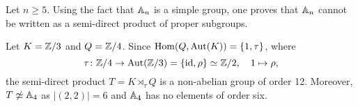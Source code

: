 Let $n\geq5$. 
Using the fact that $\mathbb{A}_n$ is a simple group,  
one proves that $\mathbb{A}_n$ cannot be written as a semi-direct product of proper subgroups. 

\begin{example}
Let $K=\mathbb{Z}/3$ and $Q=\mathbb{Z}/4$. Since $\operatorname{Hom}(Q,\operatorname{Aut}(K))=\{1,\tau\}$, where 
\[
\tau\colon\mathbb{Z}/4\to\operatorname{Aut}(\mathbb{Z}/3)=\{\operatorname{id},\rho\}\simeq\mathbb{Z}/2,\quad 1\mapsto\rho,
\]
the semi-direct product $T=K\rtimes_\tau Q$ is a non-abelian group of order 12. Moreover,
$T\not\simeq\mathbb{A}
_4$ as $|(2,2)|=6$ and $\mathbb{A}_4$ has no elements of order six.
\end{example}



